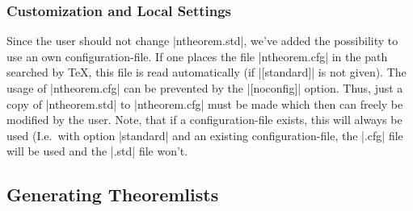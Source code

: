 \documentclass[11pt,oneside]{ltxdoc}
\theoremstyle{marginbreak}
\theoremstyle{changebreak}
\theoremstyle{change}
\theoremstyle{plain}
\theoremstyle{nonumberplain}
\begin{document}
\subsubsection{Customization and Local Settings}

Since the user should not change |ntheorem.std|,
we've added the possibility to use an own configuration-file.
If one places the file |ntheorem.cfg| in the path searched by
\TeX, this file is read automatically (if |[standard]|
is not given). The usage of |ntheorem.cfg| can be prevented by the
|[noconfig]| option. Thus, just
a copy of |ntheorem.std| to |ntheorem.cfg| must be made
which then can freely be modified by the user. Note, that if a 
configuration-file exists, this will always be used (I.e.\ with 
option |standard| and an existing configuration-file, the |.cfg| 
file will be used and the |.std| file won't.

\subsection{Generating Theoremlists}\label{sec:thmlists}
\end{document}
